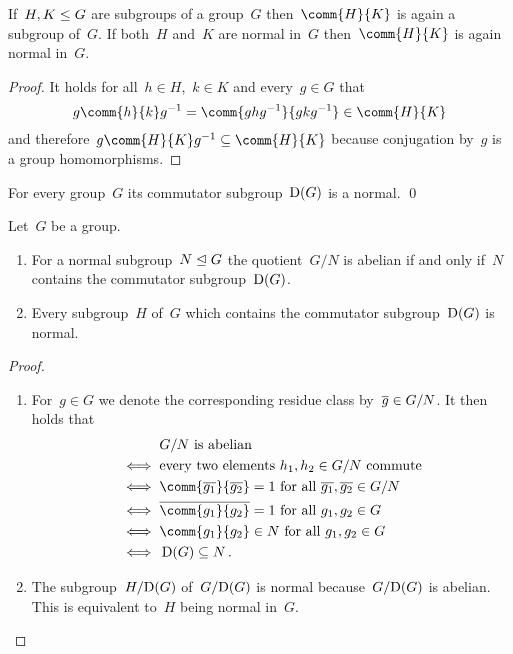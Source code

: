 \begin{lemma}
  If~$H, K \leq G$ are subgroups of a group~$G$ then~$\comm{H}{K}$ is again a subgroup of~$G$.
  If both~$H$ and~$K$ are normal in~$G$ then~$\comm{H}{K}$ is again normal in~$G$.
\end{lemma}


\begin{proof}
  It holds for all~$h \in H$,~$k \in K$ and every~$g \in G$ that
  \[
        g \comm{h}{k} g^{-1}
    =   \comm{ g h g^{-1} }{ g k g^{-1} }
    \in \comm{H}{K}
  \]
  and therefore~$g \comm{H}{K} g^{-1} \subseteq \comm{H}{K}$ because conjugation by~$g$ is a group homomorphisms.
\end{proof}


\begin{corollary}
  For every group~$G$ its commutator subgroup~$\operatorname{D}(G)$ is a normal.
  \qed
\end{corollary}


\begin{lemma}
  Let~$G$ be a group.
  \begin{enumerate}
    \item
      For a normal subgroup~$N \trianglelefteq G$ the quotient~$G/N$ is abelian if and only if~$N$ contains the commutator subgroup~$\operatorname{D}(G)$.
    \item
      Every subgroup~$H$ of~$G$ which contains the commutator subgroup~$\operatorname{D}(G)$ is normal.
  \end{enumerate}
\end{lemma}


\begin{proof}
  \leavevmode
  \begin{enumerate}
    \item
      For~$g \in G$ we denote the corresponding residue class by~$\overline{g} \in G/N$.
      It then holds that
      \begin{align*}
              & \text{$G/N$ is abelian} \\
        \iff{}& \text{every two elements~$h_1, h_2 \in G/N$ commute}  \\
        \iff{}& \text{$\comm{\class{g_1}}{\class{g_2}} = 1$ for all~$\class{g_1}, \class{g_2} \in G/N$} \\
        \iff{}& \text{$\class{ \comm{g_1}{g_2} } = 1$ for all~$g_1, g_2 \in G$} \\
        \iff{}& \text{$\comm{g_1}{g_2} \in N$ for all~$g_1, g_2 \in G$} \\
        \iff{}& \Derived(G) \subseteq N \,.
      \end{align*}
    \item
      The subgroup~$H/{\operatorname{D}(G)}$ of~$G/{\operatorname{D}(G)}$ is normal because~$G/{\operatorname{D}(G)}$ is abelian.
      This is equivalent to~$H$ being normal in~$G$.
    \qedhere
  \end{enumerate}
\end{proof}


